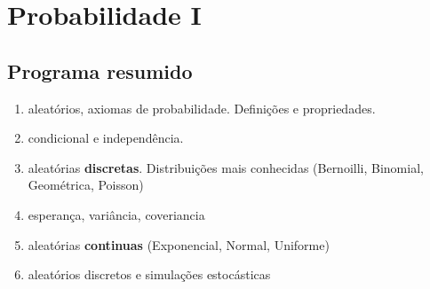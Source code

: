 \chapter[Probabilidade I]{Probabilidade I}\label{ch:probrability_I}

\section{Programa resumido}
\begin{enumerate}
  \item { aleatórios, axiomas de probabilidade.
    Definições e propriedades.}
  \item { condicional e independência.}
  \item { aleatórias \textbf{discretas}. Distribuições
    mais conhecidas (Bernoilli, Binomial, Geométrica, Poisson)}
  \item { esperança, variância, coveriancia }
  \item { aleatórias \textbf{continuas} (Exponencial,
    Normal, Uniforme)}
  \item { aleatórios discretos e simulações estocásticas}
\end{enumerate}
